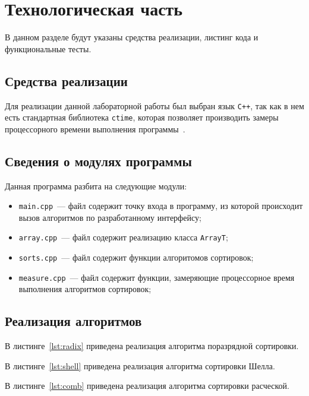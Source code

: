 \chapter{Технологическая часть}
В данном разделе будут указаны средства реализации, листинг кода и функциональные тесты.

\section{Средства реализации}
Для реализации данной лабораторной работы был выбран язык \texttt{C++}, так как в нем есть стандартная библиотека \texttt{ctime}, которая позволяет производить замеры процессорного времени выполнения программы~\cite{cpp-lang}.

\section{Сведения о модулях программы}
Данная программа разбита на следующие модули:

\begin{itemize}
	\item \texttt{main.cpp}~--- файл содержит точку входа в программу, из которой происходит вызов алгоритмов по разработанному интерфейсу;
	\item \texttt{array.cpp}~--- файл содержит реализацию класса \texttt{ArrayT};
	\item \texttt{sorts.cpp}~--- файл содержит функции алгоритомов сортировок;
	\item \texttt{measure.cpp}~--- файл содержит функции, замеряющие процессорное время выполнения алгоритмов сортировок;
\end{itemize}

\section{Реализация алгоритмов}
В листинге~\ref{lst:radix} приведена реализация алгоритма поразрядной сортировки.

В листинге~\ref{lst:shell} приведена реализация алгоритма сортировки Шелла.

В листинге~\ref{lst:comb} приведена реализация алгоритма сортировки расческой.



\clearpage



